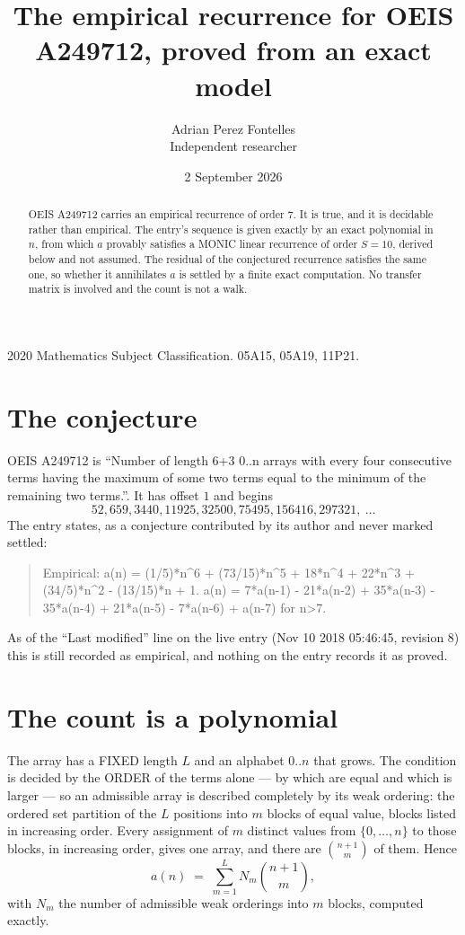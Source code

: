 \documentclass[11pt,a4paper]{article}
\title{The empirical recurrence for OEIS A249712, proved from an exact model}
\author{Adrian Perez Fontelles\\ \small Independent researcher}
\date{2 September 2026}
\theoremstyle{plain}
\theoremstyle{definition}
\begin{document}
\maketitle

\begin{abstract}
OEIS A249712 carries an empirical recurrence of order $7$. It is true, and it is
decidable rather than empirical. The entry's sequence is given exactly by an exact polynomial in $n$, from
which $a$ provably satisfies a MONIC linear recurrence of order $S=10$, derived below and not
assumed. The residual of the conjectured recurrence satisfies the same one, so whether it
annihilates $a$ is settled by a finite exact computation. No transfer matrix is involved and
the count is not a walk.
\end{abstract}

\noindent\small 2020 Mathematics Subject Classification. 05A15, 05A19, 11P21.\normalsize

\section{The conjecture}

OEIS A249712 is ``Number of length 6+3 0..n arrays with every four consecutive terms having the maximum of some two terms equal to the minimum of the remaining two terms.''. It has offset $1$ and begins
\[
52, 659, 3440, 11925, 32500, 75495, 156416, 297321,\ \dots
\]
The entry states, as a conjecture contributed by its author and never marked settled:
\begin{quote}
Empirical: a(n) = (1/5)*n\^{}6 + (73/15)*n\^{}5 + 18*n\^{}4 + 22*n\^{}3 + (34/5)*n\^{}2 - (13/15)*n + 1. a(n) = 7*a(n-1) - 21*a(n-2) + 35*a(n-3) - 35*a(n-4) + 21*a(n-5) - 7*a(n-6) + a(n-7) for n>7.
\end{quote}
As of the ``Last modified'' line on the live entry (Nov 10 2018 05:46:45, revision 8)
this is still recorded as empirical, and nothing on the entry records it as proved.

\section{The count is a polynomial}

The array has a FIXED length $L$ and an alphabet $0..n$ that grows. The condition is decided by
the ORDER of the terms alone --- by which are equal and which is larger --- so an admissible
array is described completely by its weak ordering: the ordered set partition of the $L$
positions into $m$ blocks of equal value, blocks listed in increasing order. Every assignment
of $m$ distinct values from $\{0,\dots,n\}$ to those blocks, in increasing order, gives one
array, and there are $\binom{n+1}{m}$ of them. Hence
\[
a(n)\;=\;\sum_{m=1}^{L} N_m\binom{n+1}{m},
\]
with $N_m$ the number of admissible weak orderings into $m$ blocks, computed exactly.
\end{document}
